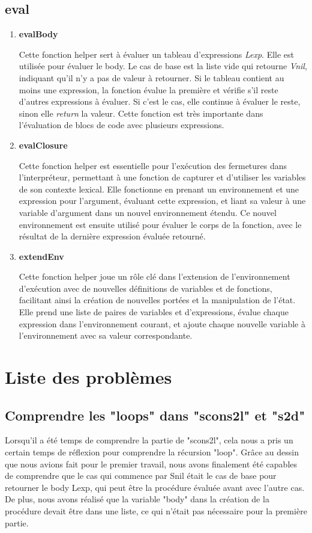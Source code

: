 \documentclass[12pt, a4paper]{article}
\begin{document}
\subsection{eval}
\begin{enumerate}
\item \textbf{evalBody}

Cette fonction helper sert à évaluer un tableau d'expressions \textit{Lexp}. Elle est utilisée pour évaluer le body. Le cas de base est la liste vide qui retourne \textit{Vnil}, indiquant qu'il n'y a pas de valeur à retourner. Si le tableau contient au moins une expression, la fonction évalue la première et vérifie s'il reste d'autres expressions à évaluer. Si c'est le cas, elle continue à évaluer le reste, sinon elle \textit{return} la valeur. Cette fonction est très importante dans l'évaluation de blocs de code avec plusieurs expressions.

\item \textbf{evalClosure}

Cette fonction helper est essentielle pour l'exécution des fermetures dans l'interpréteur, permettant à une fonction de capturer et d'utiliser les variables de son contexte lexical. Elle fonctionne en prenant un environnement et une expression pour l'argument, évaluant cette expression, et liant sa valeur à une variable d'argument dans un nouvel environnement étendu. Ce nouvel environnement est ensuite utilisé pour évaluer le corps de la fonction, avec le résultat de la dernière expression évaluée retourné.

\item \textbf{extendEnv}

Cette fonction helper joue un rôle clé dans l'extension de l'environnement d'exécution avec de nouvelles définitions de variables et de fonctions, facilitant ainsi la création de nouvelles portées et la manipulation de l'état. Elle prend une liste de paires de variables et d'expressions, évalue chaque expression dans l'environnement courant, et ajoute chaque nouvelle variable à l'environnement avec sa valeur correspondante.

\end{enumerate}
\section{Liste des problèmes}
\subsection{Comprendre les "loops" dans "scons2l" et "s2d"}
Lorsqu'il a été temps de comprendre la partie de "scons2l", cela nous a pris un certain temps de réflexion pour comprendre la récursion "loop". Grâce au dessin que nous avions fait pour le premier travail, nous avons finalement été capables de comprendre que le cas qui commence par Snil était le cas de base pour retourner le body Lexp, qui peut être la procédure évaluée avant avec l'autre cas. De plus, nous avons réalisé que la variable "body" dans la création de la procédure devait être dans une liste, ce qui n'était pas nécessaire pour la première partie.
\end{document}
